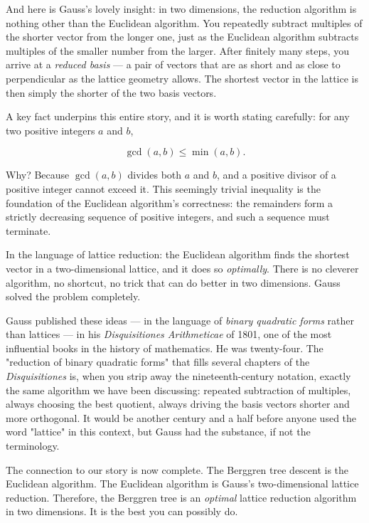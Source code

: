 \documentclass[11pt,twoside,openright]{book}
\theoremstyle{definition}
\theoremstyle{remark}
\begin{document}
And here is Gauss's lovely insight: in two dimensions, the reduction algorithm is nothing other than the Euclidean algorithm. You repeatedly subtract multiples of the shorter vector from the longer one, just as the Euclidean algorithm subtracts multiples of the smaller number from the larger. After finitely many steps, you arrive at a \textit{reduced basis} --- a pair of vectors that are as short and as close to perpendicular as the lattice geometry allows. The shortest vector in the lattice is then simply the shorter of the two basis vectors.


A key fact underpins this entire story, and it is worth stating carefully: for any two positive integers $a$ and $b$,

\[\gcd(a, b) \le \min(a, b).\]

Why? Because $\gcd(a, b)$ divides both $a$ and $b$, and a positive divisor of a positive integer cannot exceed it. This seemingly trivial inequality is the foundation of the Euclidean algorithm's correctness: the remainders form a strictly decreasing sequence of positive integers, and such a sequence must terminate.

In the language of lattice reduction: the Euclidean algorithm finds the shortest vector in a two-dimensional lattice, and it does so \textit{optimally}. There is no cleverer algorithm, no shortcut, no trick that can do better in two dimensions. Gauss solved the problem completely.

Gauss published these ideas --- in the language of \textit{binary quadratic forms} rather than lattices --- in his \textit{Disquisitiones Arithmeticae} of 1801, one of the most influential books in the history of mathematics. He was twenty-four. The "reduction of binary quadratic forms" that fills several chapters of the \textit{Disquisitiones} is, when you strip away the nineteenth-century notation, exactly the same algorithm we have been discussing: repeated subtraction of multiples, always choosing the best quotient, always driving the basis vectors shorter and more orthogonal. It would be another century and a half before anyone used the word "lattice" in this context, but Gauss had the substance, if not the terminology.

The connection to our story is now complete. The Berggren tree descent is the Euclidean algorithm. The Euclidean algorithm is Gauss's two-dimensional lattice reduction. Therefore, the Berggren tree is an \textit{optimal} lattice reduction algorithm in two dimensions. It is the best you can possibly do.
\end{document}
